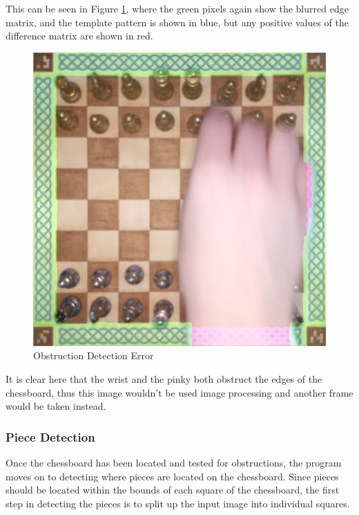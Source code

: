 \documentclass[journal]{IEEEtran}
\begin{document}
This can be seen in Figure \ref{knot error}, where the green pixels again show the blurred edge matrix, and the template pattern is shown in blue, but any positive values of the difference matrix are shown in red.

\begin{figure}[!ht]
	\centering
	\includegraphics[width=\linewidth]{Images/KnotDetectionError.jpg}
	\caption{Obstruction Detection Error}
	\label{knot error}
\end{figure}

It is clear here that the wrist and the pinky both obstruct the edges of the chessboard, thus this image wouldn't be used image processing and another frame would be taken instead.

\vspace{12pt}

\subsubsection{Piece Detection}
Once the chessboard has been located and tested for obstructions, the program moves on to detecting where pieces are located on the chessboard.
Since pieces should be located within the bounds of each square of the chessboard, the first step in detecting the pieces is to split up the input image into individual squares.
\end{document}
